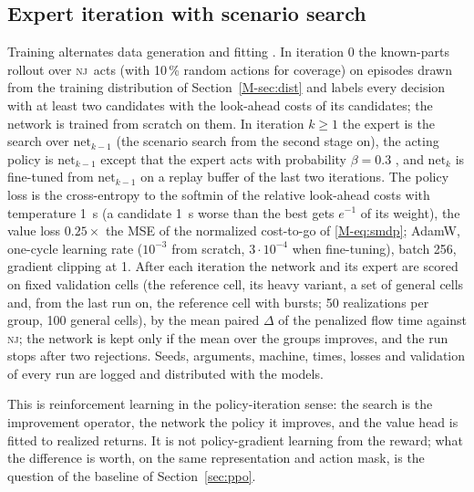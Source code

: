 \documentclass[11pt,a4paper]{article}
\theoremstyle{plain}
\theoremstyle{definition}
\theoremstyle{remark}
\newcommand{\nj}{\textsc{nj}}
\begin{document}
\subsection{Expert iteration with scenario search}
Training alternates data generation and fitting \cite{Anthony2017,Silver2018}. In
iteration 0 the known-parts rollout over \nj\ acts (with 10\,\% random actions for
coverage) on episodes drawn from the training distribution of Section~\ref{M-sec:dist} and
labels every decision with at least two candidates with the look-ahead costs of its
candidates; the network is trained from scratch on them. In iteration $k\ge1$ the expert
is the search over $\mathrm{net}_{k-1}$ (the scenario search from the second stage on),
the acting policy is $\mathrm{net}_{k-1}$ except that the expert acts with probability
$\beta=0.3$ \cite{Ross2011}, and $\mathrm{net}_k$ is fine-tuned from $\mathrm{net}_{k-1}$
on a replay buffer of the last two iterations. The policy loss is the cross-entropy to the
softmin of the relative look-ahead costs with temperature 1~s (a candidate 1~s worse than
the best gets $e^{-1}$ of its weight), the value loss $0.25\times$ the MSE of the
normalized cost-to-go of \eqref{M-eq:smdp}; AdamW, one-cycle learning rate ($10^{-3}$ from
scratch, $3\cdot10^{-4}$ when fine-tuning), batch 256, gradient clipping at 1. After each
iteration the network and its expert are scored on fixed validation cells (the reference
cell, its heavy variant, a set of general cells and, from the last run on, the reference
cell with bursts; 50 realizations per group, 100 general cells), by the mean paired
$\Delta$ of the penalized flow time against \nj; the network is kept only if the mean over
the groups improves, and the run stops after two rejections. Seeds, arguments, machine,
times, losses and validation of every run are logged and distributed with the models.

This is reinforcement learning in the policy-iteration sense: the search is the
improvement operator, the network the policy it improves, and the value head is fitted
to realized returns. It is not policy-gradient learning from the reward; what the
difference is worth, on the same representation and action mask, is the question of the
baseline of Section~\ref{sec:ppo}.
\end{document}
